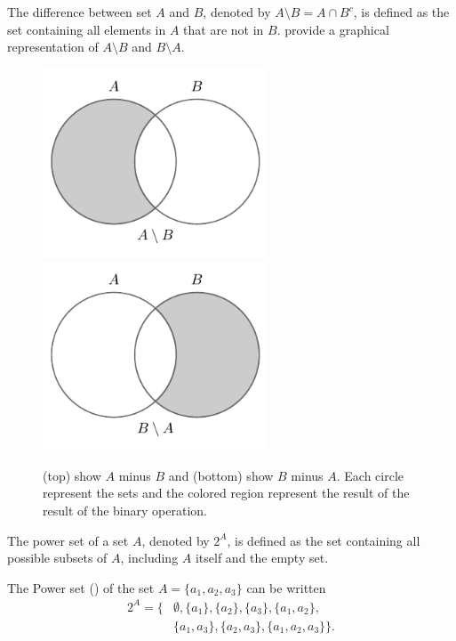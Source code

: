 \begin{definition}[Difference]
	The difference between set $A$ and $B$, denoted by $A \setminus B = A\cap B^c$, is defined as the set containing all elements in $A$ that are not in $B$.  provide a graphical representation of $A\setminus B$ and $B\setminus A$.
	\begin{figure}[H]
		\centering
		\includegraphics[width = 0.6\textwidth]{figures/set_minus.pdf}
		\includegraphics[width = 0.6\textwidth]{figures/set_minus2.pdf}
		\caption{(top) show $A$ minus $B$ and (bottom) show $B$ minus $A$. Each circle represent the sets and the colored region represent the result of the result of the binary operation.}
		\label{fig:set_minus}
	\end{figure}
\end{definition}

\begin{definition}
	\label{def:power_set}
	The power set of a set $A$, denoted by $2^A$, is defined as the set containing all possible subsets of $A$, including $A$ itself and the empty set.
\end{definition}

\begin{example}
	The Power set () of the set $A = \{a_1,a_2,a_3\}$ can be written
	\begin{equation}
		\begin{split}
			2^A = \{&\emptyset, \{a_1\}, \{a_2\}, \{a_3\}, \{a_1, a_2\},\\
			& \{a_1, a_3\}, \{a_2, a_3\}, \{a_1, a_2, a_3\}\}.
		\end{split}
	\end{equation}
\end{example}

